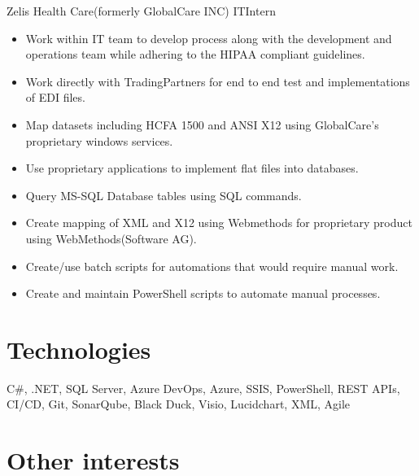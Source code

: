 \documentclass[letterpaper]{twentysecondcv} %
\begin{document}
{} %
{Zelis Health Care(formerly GlobalCare INC)} %
{ITIntern} %
{} %
\begin{itemize}
		\setlength \itemsep{0em}	
		\item Work within IT team to develop process along with the development and operations team while adhering to the HIPAA compliant guidelines.
		\item Work directly with TradingPartners for end to end test and implementations of EDI files.
		\item Map datasets including HCFA 1500 and ANSI X12 using GlobalCare’s proprietary windows services.
		\item Use proprietary applications to implement flat files into databases.
		\item Query MS-SQL Database tables using SQL commands.
		\item Create mapping of XML and X12 using Webmethods for proprietary product using WebMethods(Software AG).
		\item Create/use batch scripts for automations that would require manual work.
		\item Create and maintain PowerShell scripts to automate manual processes.
\end{itemize}



\section{Technologies} C\#, .NET, SQL Server, Azure DevOps, Azure, SSIS, PowerShell, REST APIs, CI/CD, Git, SonarQube, Black Duck, Visio, Lucidchart, XML, Agile

\section{Other interests}

\textsc{\Large\icon{\faDumbbell}}
\textsc{\Large\icon{\faGamepad}}
\textsc{\Large\icon{\faCoffee}}
\textsc{\Large\icon{\faCutlery}}
\textsc{\Large\icon{\faPaw}}
\textsc{\Large\icon{\faCar}}
\textsc{\Large\icon{\faTools}}
\end{document}

